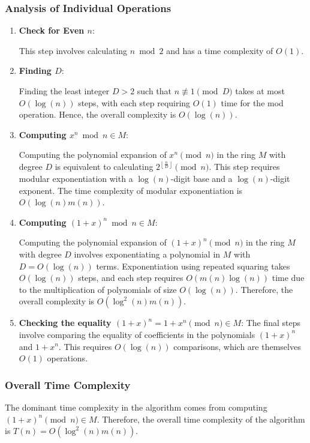 \documentclass{article}
\theoremstyle{plain}
\theoremstyle{definition}
\newcommand{\floor}[1]{\left\lfloor #1 \right\rfloor}
\newcommand{\Mx}{M}
\begin{document}
\subsubsection{Analysis of Individual Operations}
\begin{enumerate}
    \item \textbf{Check for Even \( n \)}:
    
        This step involves calculating $n \bmod{2}$ and has a time complexity of \( O(1) \).

    \item \textbf{Finding \( D \)}:
    
        Finding the least integer \( D > 2 \) such that $n \not\equiv 1 \pmod{D}$ takes at most \( O(\log(n)) \) steps, with each step requiring \( O(1) \) time for the mod operation. Hence, the overall complexity is \( O(\log(n)) \).

    \item \textbf{Computing \( x^n \bmod{n} \in \Mx \)}:
    
        Computing the polynomial expansion of $x^n \pmod{n}$ in the ring \( \Mx \) with degree $D$ is equivalent to calculating $2^{\floor{\frac{n}{D}}} \pmod{n}$. This step requires modular exponentiation with a \( \log(n) \)-digit base and a \( \log(n) \)-digit exponent. The time complexity of modular exponentiation is \( O(\log(n) m(n)) \).

    \item \textbf{Computing \( (1+x)^n \bmod{n} \in \Mx \)}:
    
        Computing the polynomial expansion of \( (1+x)^n \pmod{n} \) in the ring \( \Mx \)  with degree $D$ involves exponentiating a polynomial in $\Mx$ with \( D = O(\log(n)) \) terms. Exponentiation using repeated squaring takes \( O(\log(n)) \) steps, and each step requires \( O(m(n)\log(n)) \) time due to the multiplication of polynomials of size \( O(\log(n)) \). Therefore, the overall complexity is \( O(\log^2(n) m(n)) \).
         
    \item \textbf{Checking the equality \( (1+x)^n = 1 + x^n \pmod{n} \in \Mx \)}:
        The final steps involve comparing the equality of coefficients in the polynomials $(1+x)^n$ and $1 + x^n$. This requires $O(\log(n))$ comparisons, which are themselves \( O(1) \) operations.
\end{enumerate}

\subsubsection{Overall Time Complexity}
The dominant time complexity in the algorithm comes from computing \( (1+x)^n \pmod{n} \in \Mx \). Therefore, the overall time complexity of the algorithm is \( T(n) = O(\log^2(n) m(n)) \).
\end{document}
